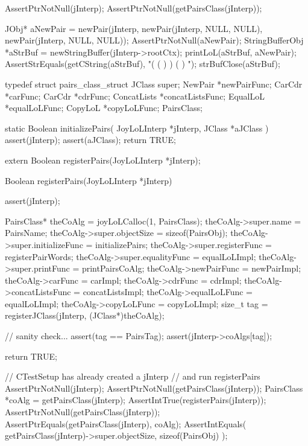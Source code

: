\startCTest
  AssertPtrNotNull(jInterp);
  AssertPtrNotNull(getPairsClass(jInterp));

  JObj* aNewPair = newPair(jInterp,
                               newPair(jInterp, NULL, NULL),
                               newPair(jInterp, NULL, NULL));
  AssertPtrNotNull(aNewPair);
  StringBufferObj *aStrBuf = newStringBuffer(jInterp->rootCtx);
  printLoL(aStrBuf, aNewPair);
  AssertStrEquals(getCString(aStrBuf), "( ( ) ) ( ) ");
  strBufClose(aStrBuf);
\stopCTest
\stopTestCase
\stopTestSuite

\startTestSuite[registerPairs]

\startCHeader
typedef struct pairs_class_struct {
  JClass       super;
  NewPair     *newPairFunc;
  CarCdr      *carFunc;
  CarCdr      *cdrFunc;
  ConcatLists *concatListsFunc;
  EqualLoL    *equalLoLFunc;
  CopyLoL     *copyLoLFunc;
} PairsClass;
\stopCHeader

\startCCode
static Boolean initializePairs(
  JoyLoLInterp *jInterp,
  JClass   *aJClass
) {
  assert(jInterp);
  assert(aJClass);
  return TRUE;
}
\stopCCode

\startCHeader
extern Boolean registerPairs(JoyLoLInterp *jInterp);
\stopCHeader
{}

\startCCode
Boolean registerPairs(JoyLoLInterp *jInterp) {
  assert(jInterp);
  
  PairsClass* theCoAlg           = joyLoLCalloc(1, PairsClass);
  theCoAlg->super.name           = PairsName;
  theCoAlg->super.objectSize     = sizeof(PairsObj);
  theCoAlg->super.initializeFunc = initializePairs;
  theCoAlg->super.registerFunc   = registerPairWords;
  theCoAlg->super.equalityFunc   = equalLoLImpl;
  theCoAlg->super.printFunc      = printPairsCoAlg;
  theCoAlg->newPairFunc          = newPairImpl;
  theCoAlg->carFunc              = carImpl;
  theCoAlg->cdrFunc              = cdrImpl;
  theCoAlg->concatListsFunc      = concatListsImpl;
  theCoAlg->equalLoLFunc         = equalLoLImpl;
  theCoAlg->copyLoLFunc          = copyLoLImpl;
  size_t tag =
    registerJClass(jInterp, (JClass*)theCoAlg);
  
  // sanity check...
  assert(tag == PairsTag);
  assert(jInterp->coAlgs[tag]);

  return TRUE;
}
\stopCCode


\startCTest
  // CTestSetup has already created a jInterp
  // and run registerPairs
  AssertPtrNotNull(jInterp);
  AssertPtrNotNull(getPairsClass(jInterp));
  PairsClass *coAlg = getPairsClass(jInterp);
  AssertIntTrue(registerPairs(jInterp));
  AssertPtrNotNull(getPairsClass(jInterp));
  AssertPtrEquals(getPairsClass(jInterp), coAlg);
  AssertIntEquals(
    getPairsClass(jInterp)->super.objectSize,
    sizeof(PairsObj)
  );
\stopCTest
\stopTestCase
\stopTestSuite

